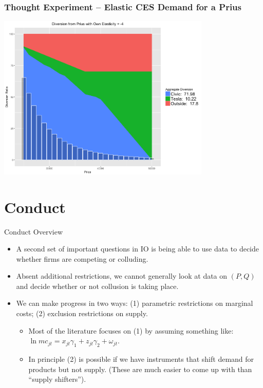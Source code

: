 \documentclass[xcolor=pdftex,dvipsnames,table,mathserif]{beamer}
\begin{document}
\begin{frame}
\frametitle{Thought Experiment -- Elastic CES Demand for a Prius}
\begin{center}
\includegraphics[width=4in]{./resources/new_prius4.png}
\end{center}
\end{frame}

\section{Conduct}

\begin{frame}{Conduct Overview}
\begin{itemize}
\item A second set of important questions in IO is being able to use data to decide whether firms are \alert{competing} or \alert{colluding}.
\item Absent additional restrictions, we cannot generally look at data on $(P,Q)$ and decide whether or not collusion is taking place.
\item We can make progress in two ways: (1) parametric restrictions on marginal costs; (2) exclusion restrictions on supply.
\begin{itemize}
\item Most of the literature focuses on (1) by assuming something like: $\ln mc_{jt} = x_{jt} \gamma_1 + z_{jt} \gamma_2 + \omega_{jt}$.
\item In principle (2) is possible if we have instruments that shift demand for products but not supply. (These are much easier to come up with than ``supply shifters'').
\end{itemize}
\end{itemize}
\end{frame}
\end{document}
